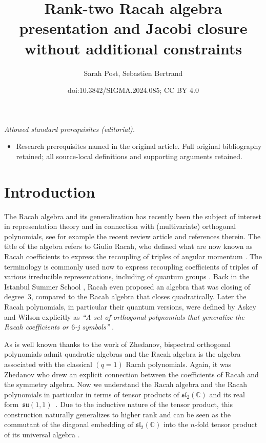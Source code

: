 \documentclass[10pt,a4paper]{amsart}
\title{Rank-two Racah algebra presentation and Jacobi closure without additional constraints}
\author{Sarah Post, Sebastien Bertrand}
\date{doi:10.3842/SIGMA.2024.085; CC BY 4.0}
\numberwithin{equation}{section}
\begin{document}
\maketitle
\noindent\textit{Allowed standard prerequisites (editorial).}\begin{itemize}
\item Research prerequisites named in the original article. Full original bibliography retained; all source-local definitions and supporting arguments retained.
\end{itemize}\medskip
\section{Introduction}

The Racah algebra and its generalization has recently been the subject of interest in representation theory and in connection with (multivariate) orthogonal polynomials, see for example the recent review article \cite{Vinet2020} and references therein. The title of the algebra refers to Giulio Racah, who defined what are now known as Racah coefficients to express the recoupling of triples of angular momentum \cite{Racah}. The terminology is commonly used now to express recoupling coefficients of triples of various irreducible representations, including of quantum groups \cite{Kirillov, Levy,Louck}. Back in the Istanbul Summer School \cite{Racah2}, Racah even proposed an algebra that was closing of degree~3, compared to the Racah algebra that closes quadratically. Later the Racah polynomials, in particular their quantum versions, were defined by Askey and Wilson explicitly as {\it ``A set of orthogonal polynomials that generalize the Racah coefficients or $6$-j symbols''} \cite{Askey}.

As is well known thanks to the work of Zhedanov, bispectral orthogonal polynomials admit quadratic algebras \cite{GLZ} and the Racah algebra is the algebra associated with the classical ${(q=1)}$ Racah polynomials. Again, it was Zhedanov \cite{GZ88} who drew an explicit connection between the coefficients of Racah and the symmetry algebra. Now we understand the Racah algebra and the Racah polynomials in particular in terms of tensor products of $\mathfrak{sl}_2(\mathbb{C})$ and its real form~$\mathfrak{su}(1,1)$~\cite{GVZ2013,GZ93, SP}. Due to the inductive nature of the tensor product, this construction naturally generalizes to higher rank \cite{BGVV2018,Vinet2020} and can be seen as the commutant of the diagonal embedding of $\mathfrak{sl}_2(\mathbb{C})$ into the $n$-fold tensor product of its universal algebra \cite{CGPAV22}.
\end{document}

